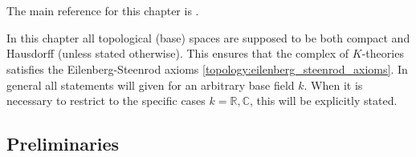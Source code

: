 \chapter{\texorpdfstring{}{K-theory}}\label{chapter:k}

    The main reference for this chapter is \cite{karoubi}.

    In this chapter all topological (base) spaces are supposed to be both compact and Hausdorff (unless stated otherwise). This ensures that the complex of $K$-theories satisfies the Eilenberg-Steenrod axioms \ref{topology:eilenberg_steenrod_axioms}. In general all statements will given for an arbitrary base field $k$. When it is necessary to restrict to the specific cases $k=\mathbb{R},\mathbb{C}$, this will be explicitly stated.

\section{Preliminaries}

